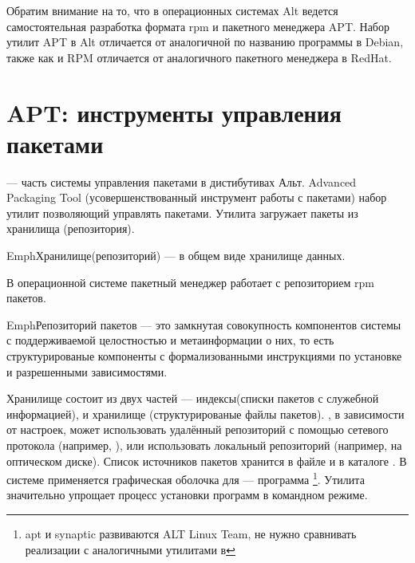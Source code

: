 Обратим внимание на то, что в операционных системах Alt ведется самостоятельная
разработка формата rpm и пакетного менеджера APT. Набор утилит APT в Alt отличается
от аналогичной по названию программы в Debian, также как и RPM отличается от
аналогичного пакетного менеджера в RedHat.

\section{APT: инструменты управления пакетами}
 --- часть системы управления пакетами в дистибутивах Альт. Advanced Packaging Tool
(усовершенствованный инструмент работы с пакетами) набор утилит позволяющий управлять пакетами.
Утилита загружает пакеты из хранилища (репозитория).

Emph{Хранилище(репозиторий)} ---  в общем виде хранилище данных.

В операционной системе  пакетный менеджер работает с репозиторием rpm пакетов.

Emph{Репозиторий пакетов} --- это замкнутая совокупность компонентов системы с
поддерживаемой целостностью и метаинформации о них, то есть структурированые
компоненты с формализованными инструкциями по установке и разрешенными зависимостями.

Хранилище состоит из двух частей --- индексы(списки пакетов с служебной информацией), и
хранилище (структурированые файлы пакетов).
 , в зависимости от настроек, может использовать удалённый репозиторий
с помощью сетевого протокола (например, ), или использовать локальный репозиторий (например,
на оптическом диске).
Список источников пакетов хранится в файле
 и в каталоге . В системе  
применяется графическая оболочка для  --- программа \footnote{apt и synaptic 
развиваются ALT Linux Team, не нужно сравнивать реализации с аналогичными утилитами в }.
Утилита  значительно упрощает процесс установки программ в командном режиме.


